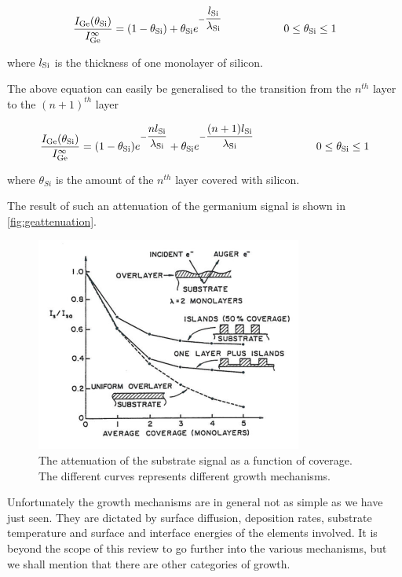 \begin{equation}
\frac{I_{\ce{Ge}}(\theta_{\ce{Si}})}{I_{\ce{Ge}}^{\infty}}=(1-\theta_{\ce{Si}})+\theta_{\ce{Si}}e^{-\dfrac{l_{\ce{Si}}}{\lambda_{\ce{Si}}}}\hspace{2cm}0\leq\theta_{\ce{Si}}\leq 1
\end{equation}

\noindent where $l_{\ce{Si}}$ is the thickness of one monolayer of silicon.

The above equation can easily be generalised to the transition from the $n^{th}$ layer to the $(n+1)^{th}$ layer

\begin{equation}
\frac{I_{\ce{Ge}}(\theta_{\ce{Si}})}{I_{\ce{Ge}}^{\infty}}=(1-\theta_{\ce{Si}})e^{-\dfrac{nl_{\ce{Si}}}{\lambda_{\ce{Si}}}}+\theta_{\ce{Si}}e^{-\dfrac{(n+1)l_{\ce{Si}}}{\lambda_{\ce{Si}}}}\hspace{2cm}0\leq\theta_{\ce{Si}}\leq 1
\end{equation}

\noindent where $\theta_{Si}$ is the amount of the $n^{th}$ layer covered with silicon.

The result of such an attenuation of the germanium signal is shown in \autoref{fig:geattenuation}.

\begin{figure}[h!]
	\begin{center}
	\includegraphics[scale=4]{figures/06_15.png}
	\caption{The attenuation of the substrate signal as a function of coverage. The different curves represents different growth mechanisms.}
	\label{fig:geattenuation}
	\end{center}
\end{figure}

Unfortunately the growth mechanisms are in general not as simple as we have just seen. They are dictated by surface diffusion, deposition rates, substrate temperature and surface and interface energies of the elements involved. It is beyond the scope of this review to go further into the various mechanisms, but we shall mention that there are other categories of growth.

